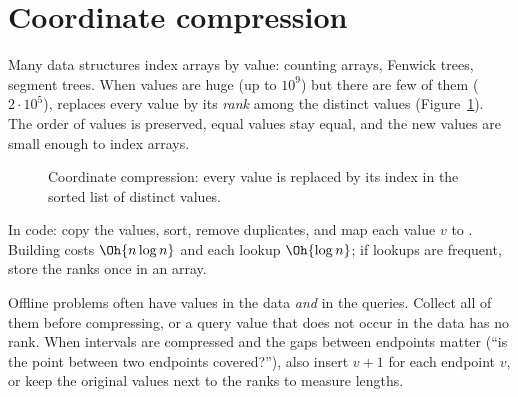 \section[Coordinate compression]{Coordinate compression \hfill \silver}\label{sec:compression}

Many data structures index arrays by value: counting arrays, Fenwick trees, segment trees. When values are huge (up to $10^9$)
but there are few of them ($2\cdot10^5$),  replaces every value by its \emph{rank} among the
distinct values (Figure~\ref{fig:compress}). The order of values is preserved, equal values stay equal, and the new values
are small enough to index arrays.

\begin{figure}[htbp]
\centering
{}
\caption{Coordinate compression: every value is replaced by its index in the sorted list of distinct values.}
\label{fig:compress}
\end{figure}

In code: copy the values, sort, remove duplicates, and map each value $v$ to .
Building costs $\Oh{n\log n}$ and each lookup $\Oh{\log n}$; if lookups are frequent, store the ranks once in an array.


\begin{pitfall}
Offline problems often have values in the data \emph{and} in the queries. Collect all of them before compressing, or a query
value that does not occur in the data has no rank. When intervals are compressed and the gaps between endpoints matter
(``is the point between two endpoints covered?''), also insert $v + 1$ for each endpoint $v$, or keep the original values next
to the ranks to measure lengths.
\end{pitfall}

